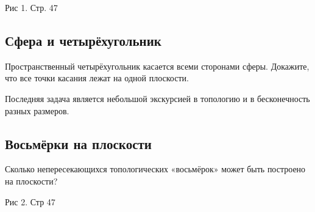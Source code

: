                               Рис  1.  Стр. 47


\subsection*{Сфера и четырёхугольник}%


Пространственный четырёхугольник касается всеми сторонами сферы.
Докажите, что все точки касания лежат на одной плоскости.




  Последняя задача является небольшой экскурсией в топологию и в бесконечность разных размеров.




\subsection*{Восьмёрки на плоскости}%


Сколько непересекающихся топологических «восьмёрок»  может быть построено на плоскости?


                                Рис 2.  Стр 47
